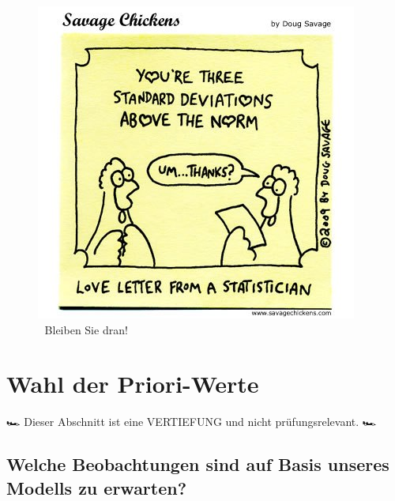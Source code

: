 \documentclass[
  a4paper,
  DIV=11]{scrreprt}
\theoremstyle{definition}
\theoremstyle{remark}
\begin{document}
\begin{figure}

{\centering \includegraphics{./img/chicken_standard_deviation.jpg}

}

\caption{🧡 Bleiben Sie dran!}

\end{figure}

\hypertarget{wahl-der-priori-werte}{%
\section{Wahl der Priori-Werte}\label{wahl-der-priori-werte}}

🏎️ Dieser Abschnitt ist eine VERTIEFUNG und nicht prüfungsrelevant. 🏎

\hypertarget{welche-beobachtungen-sind-auf-basis-unseres-modells-zu-erwarten}{%
\subsection{Welche Beobachtungen sind auf Basis unseres Modells zu
erwarten?}\label{welche-beobachtungen-sind-auf-basis-unseres-modells-zu-erwarten}}
\end{document}
